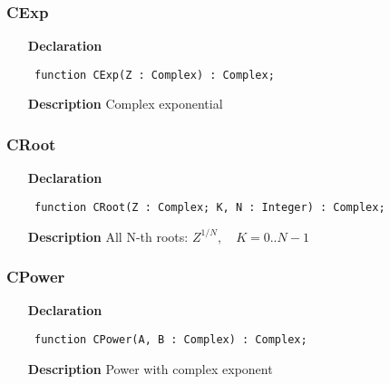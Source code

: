 \documentclass[12pt,a4paper,oneside]{report}
\newcommand{\declarationitem}[1]{\textbf{#1}}
\newcommand{\descriptiontitle}[1]{\textbf{#1}}
\newcommand{\code}[1]{\texttt{#1}}
\begin{document}
\subsubsection{CExp}
\label{ucomplex-CExp}
\begin{itemize}\item[\declarationitem{Declaration}\hfill]
\begin{flushleft}
\code{
function CExp(Z : Complex) : Complex;}

\end{flushleft}

\par
\item[\descriptiontitle{Description}]
Complex exponential

\end{itemize}
\subsubsection{CRoot}
\label{ucomplex-CRoot}
\begin{itemize}\item[\declarationitem{Declaration}\hfill]
\begin{flushleft}
\code{
function CRoot(Z : Complex; K, N : Integer) : Complex;}

\end{flushleft}

\par
\item[\descriptiontitle{Description}]
All N{-}th roots: $Z^{1/N},\quad K=0..N-1$
\end{itemize}
\subsubsection{CPower}
\label{ucomplex-CPower}
\begin{itemize}\item[\declarationitem{Declaration}\hfill]
\begin{flushleft}
\code{
function CPower(A, B : Complex) : Complex;}

\end{flushleft}

\par
\item[\descriptiontitle{Description}]
Power with complex exponent

\end{itemize}
\end{document}
